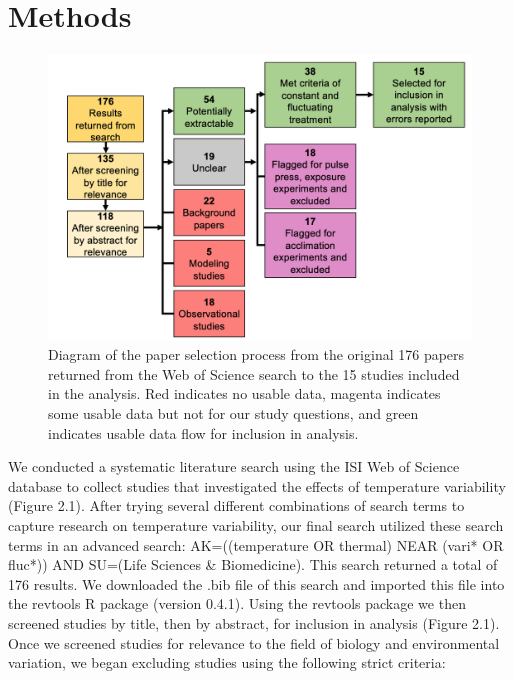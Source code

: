 \documentclass[12pt,twoside]{reedthesis}
\begin{document}
\hypertarget{methods}{%
\chapter{Methods}\label{methods}}
\begin{figure}

{\centering \includegraphics[width=0.9\linewidth]{figures/figure5} 

}

\caption[Meta-analysis paper selection process]{Diagram of the paper selection process from the original 176 papers returned from the Web of Science search to the 15 studies included in the analysis. Red indicates no usable data, magenta indicates some usable data but not for our study questions, and green indicates usable data flow for inclusion in analysis.}\label{fig:unnamed-chunk-7}
\end{figure}
We conducted a systematic literature search using the ISI Web of Science database to collect studies that investigated the effects of temperature variability (Figure 2.1). After trying several different combinations of search terms to capture research on temperature variability, our final search utilized these search terms in an advanced search: AK=((temperature OR thermal) NEAR (vari* OR fluc*)) AND SU=(Life Sciences \& Biomedicine). This search returned a total of 176 results. We downloaded the .bib file of this search and imported this file into the revtools R package (version 0.4.1). Using the revtools package we then screened studies by title, then by abstract, for inclusion in analysis (Figure 2.1). Once we screened studies for relevance to the field of biology and environmental variation, we began excluding studies using the following strict criteria:
\end{document}
